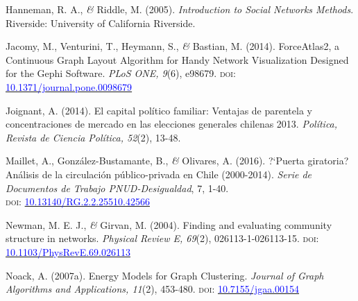 \documentclass[a4paper]{tufte-handout}
\begin{document}
{\begin{list}{}
\item{\small Hanneman, R. A., {\itshape \&} Riddle, M. (2005). {\itshape Introduction to Social Networks Methods}. Riverside: University of California Riverside.}

\item{\small Jacomy, M., Venturini, T., Heymann, S., {\itshape \&} Bastian, M. (2014). ForceAtlas2, a Continuous Graph Layout Algorithm for Handy Network Visualization Designed for the Gephi Software. {\itshape PLoS ONE, 9}(6), e98679. {\scshape doi:} \href{https://doi.org/10.1371/journal.pone.0098679}{\textcolor{blue}{10.1371/journal.pone.0098679}}}


\item{\small Joignant, A. (2014). El capital pol\'itico familiar: Ventajas de parentela y concentraciones de mercado en las elecciones generales chilenas 2013. {\itshape Pol\'itica, Revista de Ciencia Pol\'itica, 52}(2), 13-48.}

\item{\small Maillet, A., Gonz\'alez-Bustamante, B., {\itshape \&} Olivares, A. (2016). ?`Puerta giratoria? An\'alisis de la circulaci\'on p\'ublico-privada en Chile (2000-2014). {\itshape Serie de Documentos de Trabajo PNUD-Desigualdad}, 7,  1-40. \\ {\scshape doi:} \href{https://doi.org/10.13140/RG.2.2.25510.42566}{\textcolor{blue}{10.13140/RG.2.2.25510.42566}}}

\item {\small Newman, M. E. J., {\itshape \&} Girvan, M. (2004). Finding and evaluating community structure in networks. {\itshape Physical Review E, 69}(2), 026113-1-026113-15. {\scshape doi:} \href{https://doi.org/10.1103/PhysRevE.69.026113}{\textcolor{blue}{10.1103/PhysRevE.69.026113}}}

\item{\small Noack, A. (2007a). Energy Models for Graph Clustering. {\itshape Journal of Graph Algorithms and Applications, 11}(2), 453-480. {\scshape doi:} \href{http://dx.doi.org/10.7155/jgaa.00154}{\textcolor{blue}{10.7155/jgaa.00154}}}


\end{list}}
\end{document}
